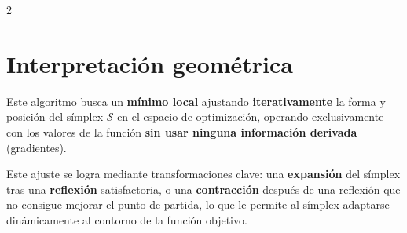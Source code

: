 \documentclass[a4paper, 9pt]{article}
\begin{document}
\begin{multicols}{2}
        \section{Interpretación geométrica}

        Este algoritmo busca un \textbf{mínimo local} ajustando \textbf{iterativamente} la forma y posición del símplex $\mathcal{S}$ en el espacio de optimización, operando exclusivamente con los valores de la función \textbf{sin usar ninguna información derivada} (gradientes). 
        
        Este ajuste se logra mediante transformaciones clave: una \textbf{expansión} del símplex tras una \textbf{reflexión} satisfactoria, o una \textbf{contracción} después de una reflexión que no consigue mejorar el punto de partida, lo que le permite al símplex adaptarse dinámicamente al contorno de la función objetivo.
        
    \end{multicols}
\end{document}
